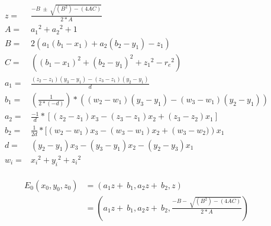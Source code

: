    
       \begin{align}
        z={}& \frac{-B\ \pm \ \sqrt{\left(B^2\right)-(4AC)}}{2*A} 
        \label{eq:cap4_eq_4} \\
        A={}& {a_1}^2+{a_2}^2+1
        \label{eq:cap4_eq_5} \\
        B={}&  2\left(a_1(b_1-x_1)+a_2(b_2-y_1)-z_1\right)
        \label{eq:cap4_eq_6} \\
        C={}& ({(b_1-x_1)}^2+{(b_2-y_1)}^2+{z_1}^2- {r_e}^2) 
        \label{eq:cap4_eq_7} \\
        a_1={}& \frac{\left(z_2-z_1\right)\left(y_3-y_1\right)-\left(z_3-z_1\right)\left(y_2-y_1\right)}{d} 
        \label{eq:cap4_eq_8} \\
        b_1={}& \left(\frac{1}{2*(-d)}\right)*\left(\left(w_2 - w_1\right)\left(y_3-y_1\right)-\left(w_3 - w_1\right)\left(y_2-y_1\right)\right)
        \label{eq:cap4_eq_9} \\
        a_2={}& \frac{-1}{d}*\left[\left(z_2-z_1\right)x_3-(z_3-z_1)x_2+(z_3-z_2)x_1\right]
        \label{eq:cap4_eq_10} \\
        b_2={}& \frac{1}{2d}*[\left(w_2-w_1\right)x_3-\left(w_3-w_1\right)x_2+\left(w_3-w_2)\right)x_1
        \label{eq:cap4_eq_11} \\
        d={}& \left(y_2- y_1\right)x_3-\left(y_3-y_1\right)x_2- \left(y_2-y_3\right)x_1
        \label{eq:cap4_eq_12} \\
        w_i={}& {x_i}^2+{y_i}^2 +{z_i}^2
        \label{eq:cap4_eq_13} 
    \end{align}
    
        \begin{align}
    \begin{split}
            E_0\left(x_0,y_0,z_0\right)& ={} \left(a_1z+\ b_1,a_2z+\ b_2,z\right)\\
                 & ={} \left(a_1z+\ b_1,a_2z+\ b_2,\frac{-B-\ \sqrt{\left(B^2\right)-\left(4AC\right)}}{2*A}\right)\\
    \end{split}
    \label{eq:cap4_eq_3}
    \end{align}
    